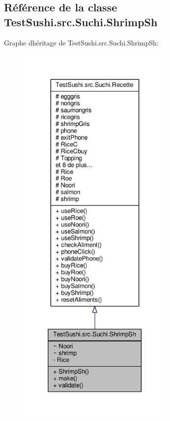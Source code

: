 \hypertarget{classTestSushi_1_1src_1_1Suchi_1_1ShrimpSh}{}\subsection{Référence de la classe Test\+Sushi.\+src.\+Suchi.\+Shrimp\+Sh}
\label{classTestSushi_1_1src_1_1Suchi_1_1ShrimpSh}


Graphe d\textquotesingle{}héritage de Test\+Sushi.\+src.\+Suchi.\+Shrimp\+Sh\+:\nopagebreak
\begin{figure}[H]
\begin{center}
\leavevmode
\includegraphics[height=550pt]{classTestSushi_1_1src_1_1Suchi_1_1ShrimpSh__inherit__graph}
\end{center}
\end{figure}


